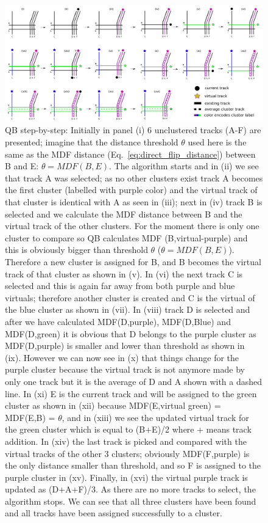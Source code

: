 \documentclass[preprint,authoryear,a4paper,10pt,onecolumn]{elsarticle}
\begin{document}
\begin{figure}
\includegraphics[scale=0.25]{last_figures/LSC_algorithm}
\caption{QB step-by-step: Initially in panel (i) 6 unclustered tracks
  (A-F) are presented; imagine that the distance threshold $\theta$ used here is
  the same as the MDF distance (Eq.~\ref{eq:direct_flip_distance}) between B and
  E: $\theta = MDF(B,E)$. The algorithm starts and in (ii) we see that track A
  was selected; as no other clusters exist track A becomes the first cluster
  (labelled with purple color) and the virtual track of that cluster is
  identical with A as seen in (iii); next in (iv) track B is selected and we
  calculate the MDF distance between B and the virtual track of the other
  clusters. For the moment there is only one cluster to compare so QB calculates
  MDF (B,virtual-purple) and this is obviously bigger than threshold $\theta$
  ($\theta = MDF(B,E)$).  Therefore a new cluster is assigned for B, and B
  becomes the virtual track of that cluster as shown in (v). In (vi) the next
  track C is selected and this is again far away from both purple and blue
  virtuals; therefore another cluster is created and C is the virtual of the
  blue cluster as shown in (vii).  In (viii) track D is selected and after we
  have calculated MDF(D,purple), MDF(D,Blue) and MDF(D,green) it is obvious that
  D belongs to the purple cluster as MDF(D,purple) is smaller and lower than
  threshold as shown in (ix).  However we can now see in (x) that things change
  for the purple cluster because the virtual track is not anymore made by only
  one track but it is the average of D and A shown with a dashed line. In (xi) E
  is the current track and will be assigned to the green cluster as shown in
  (xii) because MDF(E,virtual green) = MDF(E,B) = $\theta$, and in (xiii) we see
  the updated virtual track for the green cluster which is equal to (B+E)/2
  where + means track addition. In (xiv) the last track is picked and compared
  with the virtual tracks of the other 3 clusters; obviously MDF(F,purple) is
  the only distance smaller than threshold, and so F is assigned to the purple
  cluster in (xv).  Finally, in (xvi) the virtual purple track is updated as
  (D+A+F)/3. As there are no more tracks to select, the algorithm stops. We can
  see that all three clusters have been found and all tracks have been assigned
  successfully to a cluster.
  \label{Fig:LSC_simple}}
\end{figure}
\end{document}
